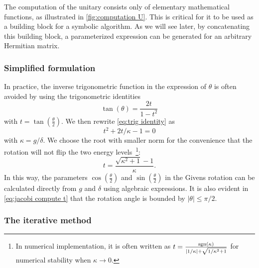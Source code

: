 \documentclass[%
 reprint,
 amsmath,amssymb,
 aps,
pra,
noeprint,
superscriptaddress,
]{revtex4-2}
\begin{document}
The computation of the unitary consists only of elementary mathematical functions, as illustrated in \cref{fig:computation U}.
This is critical for it to be used as a building block for a symbolic algorithm.
As we will see later, by concatenating this building block, a parameterized expression can be generated for an arbitrary Hermitian matrix.

\subsubsection{Simplified formulation}
In practice, the inverse trigonometric function in the expression of $\theta$ is often avoided by using the trigonometric identities
\begin{equation}
\label{eq:trig identity}
    \tan(\theta) = \frac{2t}{1-t^2}
\end{equation}
with $t=\tan(\frac{\theta}{2})$.
We then rewrite \cref{eq:trig identity} as
\begin{equation}
    t^2 + 2t/\kappa - 1 = 0
\end{equation}
with $\kappa=g/\delta$.
We choose the root with smaller norm for the convenience that the rotation will not flip the two energy levels~\footnote{In numerical implementation, it is often written as $t = \frac{\textnormal{sgn}(\kappa)}{|1/\kappa|+\sqrt{1/\kappa^2+1}}$ for numerical stability when $\kappa \rightarrow 0$.}:
\begin{equation}
    \label{eq:jacobi compute t}
    t = \frac{\sqrt{ \kappa ^ 2+1} - 1}{\kappa}
    .
\end{equation}
In this way, the parameters $\cos(\frac{\theta}{2})$ and $\sin(\frac{\theta}{2})$ in the Givens rotation can be calculated directly from $g$ and $\delta$ using algebraic expressions.
It is also evident in \cref{eq:jacobi compute t} that the rotation angle is bounded by $|\theta| \leq \pi/2$.



\subsubsection{The iterative method}
\label{sec:jacobi iteration detail}
\end{document}
